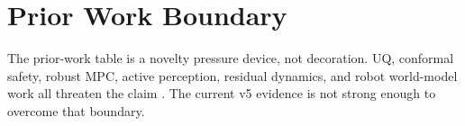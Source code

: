 \documentclass{article}
\begin{document}
\section{Prior Work Boundary}

The prior-work table is a novelty pressure device, not decoration. UQ, conformal safety, robust MPC, active perception, residual dynamics, and robot world-model work all threaten the claim \citep{pool88_01,pool88_02,pool88_03,pool88_04,pool88_05,pool88_06,pool88_07,pool88_08,pool88_09,pool88_10,pool88_11,pool88_12,pool88_13,pool88_14,pool88_15,pool88_16,pool88_17,pool88_18,pool88_19,pool88_20,pool88_21,pool88_22,pool88_23,pool88_24,pool88_25,pool88_26,pool88_27,pool88_28,pool88_29,pool88_30,pool88_31,pool88_32,pool88_33,pool88_34,pool88_35,pool88_36,pool88_37,pool88_38,pool88_39,pool88_40,pool88_41,pool88_42,pool88_43,pool88_44,pool88_45,pool88_46,pool88_47,pool88_48}. The current v5 evidence is not strong enough to overcome that boundary.
\end{document}
